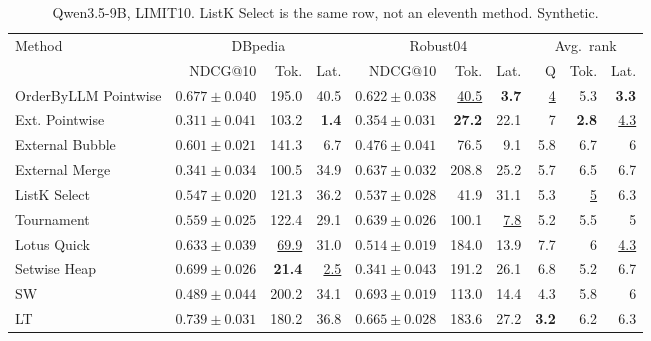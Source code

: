 \begin{table}[t]
\centering\footnotesize\setlength{\tabcolsep}{3.2pt}\renewcommand{\arraystretch}{1.12}
\caption{Qwen3.5-9B, LIMIT10. ListK Select is the same row, not an eleventh method. Synthetic.}
\begin{tabular}{@{}lrrrrrrrrr@{}}
\toprule
Method & \multicolumn{3}{c}{DBpedia} & \multicolumn{3}{c}{Robust04} & \multicolumn{3}{c}{Avg.\ rank} \\
\cmidrule(lr){2-4} \cmidrule(lr){5-7} \cmidrule(lr){8-10}
 & NDCG@10 & Tok. & Lat. & NDCG@10 & Tok. & Lat. & Q & Tok. & Lat. \\
\midrule
OrderByLLM Pointwise & $0.677\pm0.040$ & 195.0 & 40.5 & $0.622\pm0.038$ & \underline{40.5} & \textbf{3.7} & \underline{4} & 5.3 & \textbf{3.3} \\
Ext. Pointwise & $0.311\pm0.041$ & 103.2 & \textbf{1.4} & $0.354\pm0.031$ & \textbf{27.2} & 22.1 & 7 & \textbf{2.8} & \underline{4.3} \\
External Bubble & $0.601\pm0.021$ & 141.3 & 6.7 & $0.476\pm0.041$ & 76.5 & 9.1 & 5.8 & 6.7 & 6 \\
External Merge & $0.341\pm0.034$ & 100.5 & 34.9 & $0.637\pm0.032$ & 208.8 & 25.2 & 5.7 & 6.5 & 6.7 \\
ListK Select & $0.547\pm0.020$ & 121.3 & 36.2 & $0.537\pm0.028$ & 41.9 & 31.1 & 5.3 & \underline{5} & 6.3 \\
Tournament & $0.559\pm0.025$ & 122.4 & 29.1 & $0.639\pm0.026$ & 100.1 & \underline{7.8} & 5.2 & 5.5 & 5 \\
Lotus Quick & $0.633\pm0.039$ & \underline{69.9} & 31.0 & $0.514\pm0.019$ & 184.0 & 13.9 & 7.7 & 6 & \underline{4.3} \\
Setwise Heap & \underline{$0.699\pm0.026$} & \textbf{21.4} & \underline{2.5} & $0.341\pm0.043$ & 191.2 & 26.1 & 6.8 & 5.2 & 6.7 \\
SW & $0.489\pm0.044$ & 200.2 & 34.1 & \textbf{$0.693\pm0.019$} & 113.0 & 14.4 & 4.3 & 5.8 & 6 \\
LT & \textbf{$0.739\pm0.031$} & 180.2 & 36.8 & \underline{$0.665\pm0.028$} & 183.6 & 27.2 & \textbf{3.2} & 6.2 & 6.3 \\
\bottomrule
\end{tabular}
\end{table}


